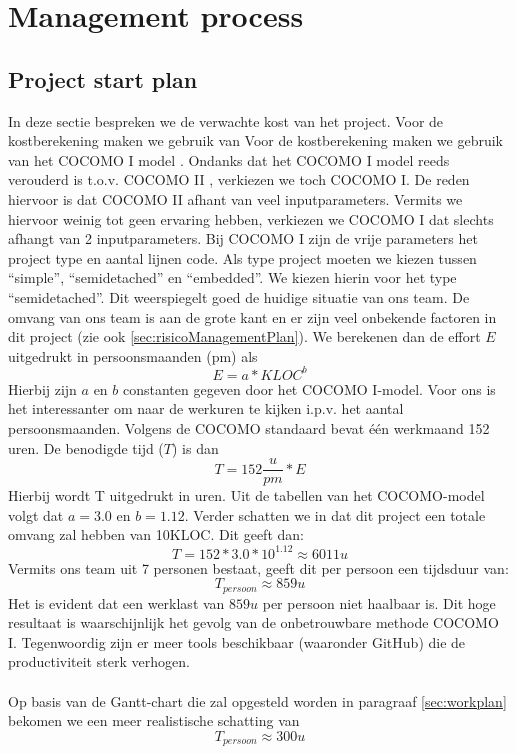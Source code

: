 \chapter{Management process}
\section{Project start plan} \label{sec:ProjectStartPlan}
In deze sectie bespreken we de verwachte kost van het project. Voor de kostberekening maken we gebruik van  Voor de kostberekening maken we gebruik van het COCOMO I model \cite{CocomoI}. Ondanks dat het COCOMO I model reeds verouderd is t.o.v. COCOMO II \cite{CocomoII}, verkiezen we toch COCOMO I. De reden hiervoor is dat COCOMO II afhant van veel inputparameters. Vermits we hiervoor weinig tot geen ervaring hebben, verkiezen we COCOMO I dat slechts afhangt van 2 inputparameters. Bij COCOMO I zijn de vrije parameters het project type en aantal lijnen code. Als type project moeten we kiezen tussen ``simple'', ``semidetached'' en ``embedded''. We kiezen hierin voor het type ``semidetached''. Dit weerspiegelt goed de huidige situatie van ons team. De omvang van ons team is aan de grote kant en er zijn veel onbekende factoren in dit project (zie ook \ref{sec:risicoManagementPlan}). We berekenen dan de effort $E$ uitgedrukt in persoonsmaanden (pm) als
\begin{equation*}
	E = a*KLOC^b
\end{equation*}
Hierbij zijn $a$ en $b$ constanten gegeven door het COCOMO I-model. Voor ons is het interessanter om naar de werkuren te kijken i.p.v. het aantal persoonsmaanden. Volgens de COCOMO standaard bevat \'{e}\'{e}n werkmaand 152 uren.  De benodigde tijd ($T$) is dan
\begin{equation*}
	T = 152\frac{u}{pm}*E
\end{equation*}
Hierbij wordt T uitgedrukt in uren. Uit de tabellen van het COCOMO-model volgt dat $a = 3.0$ en $b = 1.12$. Verder schatten we in dat dit project een totale omvang zal hebben van 10KLOC. Dit geeft dan:
\begin{equation*}
	T = 152*3.0*10^{1.12} \approx 6011u 
\end{equation*}
Vermits ons team uit 7 personen bestaat, geeft dit per persoon een tijdsduur van:
\begin{equation*}
	T_{persoon} \approx 859u
\end{equation*}
Het is evident dat een werklast van $859u$ per persoon niet haalbaar is. Dit hoge resultaat is waarschijnlijk het gevolg van de onbetrouwbare methode COCOMO I. Tegenwoordig zijn er meer tools beschikbaar (waaronder GitHub) die de productiviteit sterk verhogen. 
\\
\\
Op basis van de Gantt-chart die zal opgesteld worden in paragraaf \ref{sec:workplan} bekomen we een meer realistische schatting van 
\begin{equation*}
	T_{persoon} \approx 300u
\end{equation*}
